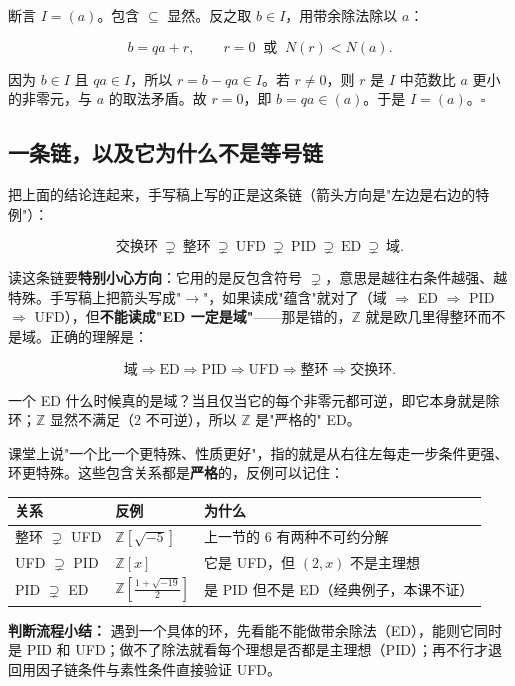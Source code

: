 断言 $I=(a)$。包含 $\subseteq$ 显然。反之取 $b\in I$，用带余除法除以 $a$：

\[
b=qa+r,\qquad r=0\ \text{ 或 }\ N(r)<N(a).
\]

因为 $b\in I$ 且 $qa\in I$，所以 $r=b-qa\in I$。若 $r\ne0$，则 $r$ 是 $I$ 中范数比 $a$ 更小的非零元，与 $a$ 的取法矛盾。故 $r=0$，即 $b=qa\in(a)$。于是 $I=(a)$。$\square$

\subsection{一条链，以及它为什么不是等号链}


把上面的结论连起来，手写稿上写的正是这条链（箭头方向是"左边是右边的特例"）：

\[
\text{交换环}\ \supsetneq\ \text{整环}\ \supsetneq\ \text{UFD}\ \supsetneq\ \text{PID}\ \supsetneq\ \text{ED}\ \supsetneq\ \text{域}.
\]

读这条链要\textbf{特别小心方向}：它用的是反包含符号 $\supsetneq$，意思是越往右条件越强、越特殊。手写稿上把箭头写成"$\to$"，如果读成"蕴含"就对了（域 $\Rightarrow$ ED $\Rightarrow$ PID $\Rightarrow$ UFD），但\textbf{不能读成"ED 一定是域"}——那是错的，$\mathbb Z$ 就是欧几里得整环而不是域。正确的理解是：

\[
\text{域}\Longrightarrow\text{ED}\Longrightarrow\text{PID}\Longrightarrow\text{UFD}\Longrightarrow\text{整环}\Longrightarrow\text{交换环}.
\]

一个 ED 什么时候真的是域？当且仅当它的每个非零元都可逆，即它本身就是除环；$\mathbb Z$ 显然不满足（$2$ 不可逆），所以 $\mathbb Z$ 是"严格的" ED。

课堂上说"一个比一个更特殊、性质更好"，指的就是从右往左每走一步条件更强、环更特殊。这些包含关系都是\textbf{严格}的，反例可以记住：


\begin{center}
\begin{tabular}{lll}
关系 & 反例 & 为什么\\ \hline
整环 $\supsetneq$ UFD & $\mathbb Z[\sqrt{-5}]$ & 上一节的 $6$ 有两种不可约分解\\
UFD $\supsetneq$ PID & $\mathbb Z[x]$ & 它是 UFD，但 $(2,x)$ 不是主理想\\
PID $\supsetneq$ ED & $\mathbb Z\!\left[\frac{1+\sqrt{-19}}{2}\right]$ & 是 PID 但不是 ED（经典例子，本课不证）
\end{tabular}
\end{center}


\textbf{判断流程小结：} 遇到一个具体的环，先看能不能做带余除法（ED），能则它同时是 PID 和 UFD；做不了除法就看每个理想是否都是主理想（PID）；再不行才退回用因子链条件与素性条件直接验证 UFD。

